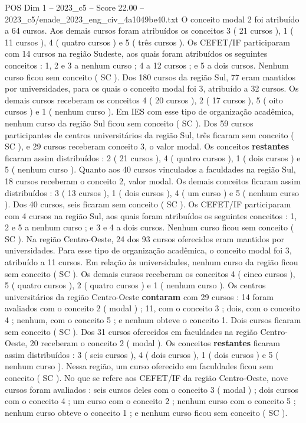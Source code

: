 \begin{textsample}{POS Dim 1 – 2023\_c5 – Score 22.00 – 2023\_c5/enade\_2023\_eng\_civ\_4a1049be40.txt}
O conceito modal 2 foi atribuído a 64 cursos.
Aos demais cursos foram atribuídos os conceitos 3 ( 21 cursos ), 1 ( 11 cursos ), 4 ( quatro cursos ) e 5 ( três cursos ).
Os CEFET/IF participaram com 14 cursos na região Sudeste, aos quais foram atribuídos os seguintes conceitos : 1, 2 e 3 a nenhum curso ; 4 a 12 cursos ; e 5 a dois cursos.
Nenhum curso ficou sem conceito ( SC ).
Dos 180 cursos da região Sul, 77 eram mantidos por universidades, para os quais o conceito modal foi 3, atribuído a 32 cursos.
Os demais cursos receberam os conceitos 4 ( 20 cursos ), 2 ( 17 cursos ), 5 ( oito cursos ) e 1 ( nenhum curso ).
Em IES com esse tipo de organização acadêmica, nenhum curso da região Sul ficou sem conceito ( SC ).
Dos 59 cursos participantes de centros universitários da região Sul, três ficaram sem conceito ( SC ), e 29 cursos receberam conceito 3, o valor modal.
Os conceitos \textbf{restantes} ficaram assim distribuídos : 2 ( 21 cursos ), 4 ( quatro cursos ), 1 ( dois cursos ) e 5 ( nenhum curso ).
Quanto aos 40 cursos vinculados a faculdades na região Sul, 18 cursos receberam o conceito 2, valor modal.
Os demais conceitos ficaram assim distribuídos : 3 ( 13 cursos ), 1 ( dois cursos ), 4 ( um curso ) e 5 ( nenhum curso ).
Dos 40 cursos, seis ficaram sem conceito ( SC ).
Os CEFET/IF participaram com 4 cursos na região Sul, aos quais foram atribuídos os seguintes conceitos : 1, 2 e 5 a nenhum curso ; e 3 e 4 a dois cursos.
Nenhum curso ficou sem conceito ( SC ).
Na região Centro-Oeste, 24 dos 93 cursos oferecidos eram mantidos por universidades.
Para esse tipo de organização acadêmica, o conceito modal foi 3, atribuído a 11 cursos.
Em relação às universidades, nenhum curso da região ficou sem conceito ( SC ).
Os demais cursos receberam os conceitos 4 ( cinco cursos ), 5 ( quatro cursos ), 2 ( quatro cursos ) e 1 ( nenhum curso ).
Os centros universitários da região Centro-Oeste \textbf{contaram} com 29 cursos : 14 foram avaliados com o conceito 2 ( modal ) ; 11, com o conceito 3 ; dois, com o conceito 4 ; nenhum, com o conceito 5 ; e nenhum obteve o conceito 1.
Dois cursos ficaram sem conceito ( SC ).
Dos 31 cursos oferecidos em faculdades na região Centro-Oeste, 20 receberam o conceito 2 ( modal ).
Os conceitos \textbf{restantes} ficaram assim distribuídos : 3 ( seis cursos ), 4 ( dois cursos ), 1 ( dois cursos ) e 5 ( nenhum curso ).
Nessa região, um curso oferecido em faculdades ficou sem conceito ( SC ).
No que se refere aos CEFET/IF da região Centro-Oeste, nove cursos foram avaliados : seis cursos deles com o conceito 3 ( modal ) ; dois cursos com o conceito 4 ; um curso com o conceito 2 ; nenhum curso com o conceito 5 ; nenhum curso obteve o conceito 1 ; e nenhum curso ficou sem conceito ( SC ).

\end{textsample}
